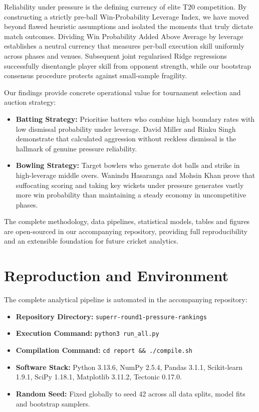 \documentclass[11pt,a4paper]{article}
\begin{document}
Reliability under pressure is the defining currency of elite T20 competition. By constructing a strictly pre-ball Win-Probability Leverage Index, we have moved beyond flawed heuristic assumptions and isolated the moments that truly dictate match outcomes. Dividing Win Probability Added Above Average by leverage establishes a neutral currency that measures per-ball execution skill uniformly across phases and venues. Subsequent joint regularised Ridge regressions successfully disentangle player skill from opponent strength, while our bootstrap consensus procedure protects against small-sample fragility.

Our findings provide concrete operational value for tournament selection and auction strategy:
\begin{itemize}
    \item \textbf{Batting Strategy:} Prioritise batters who combine high boundary rates with low dismissal probability under leverage. David Miller and Rinku Singh demonstrate that calculated aggression without reckless dismissal is the hallmark of genuine pressure reliability.
    \item \textbf{Bowling Strategy:} Target bowlers who generate dot balls and strike in high-leverage middle overs. Wanindu Hasaranga and Mohsin Khan prove that suffocating scoring and taking key wickets under pressure generates vastly more win probability than maintaining a steady economy in uncompetitive phases.
\end{itemize}
The complete methodology, data pipelines, statistical models, tables and figures are open-sourced in our accompanying repository, providing full reproducibility and an extensible foundation for future cricket analytics.

\newpage
\appendix

\section{Reproduction and Environment}
\label{app:reproduction}
The complete analytical pipeline is automated in the accompanying repository:
\begin{itemize}
    \item \textbf{Repository Directory:} \texttt{superr-round1-pressure-rankings}
    \item \textbf{Execution Command:} \texttt{python3 run\_all.py}
    \item \textbf{Compilation Command:} \texttt{cd report \&\& ./compile.sh}
    \item \textbf{Software Stack:} Python 3.13.6, NumPy 2.5.4, Pandas 3.1.1, Scikit-learn 1.9.1, SciPy 1.18.1, Matplotlib 3.11.2, Tectonic 0.17.0.
    \item \textbf{Random Seed:} Fixed globally to seed 42 across all data splits, model fits and bootstrap samplers.
\end{itemize}
\end{document}
